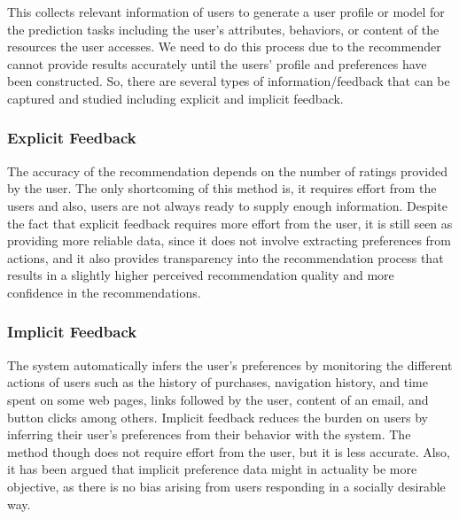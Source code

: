 \documentclass[12pt,oneside,openright,a4paper]{cpe-english-project}
\begin{document}
This collects relevant information of users to generate a user profile or model for the prediction tasks including the user’s attributes, behaviors, or content of the resources the user accesses. \cite{WhatisMachineLearning} We need to do this process due to the recommender cannot provide results accurately until the users’ profile and preferences have been constructed. So, there are several types of information/feedback that can be captured and studied including explicit and implicit feedback.


\subsubsection{Explicit Feedback}

The accuracy of the recommendation depends on the number of ratings provided by the user. The only shortcoming of this method is, it requires effort from the users and also, users are not always ready to supply enough information. Despite the fact that explicit feedback requires more effort from the user, it is still seen as providing more reliable data, since it does not involve extracting preferences from actions, and it also provides transparency into the recommendation process that results in a slightly higher perceived recommendation quality and more confidence in the recommendations. \cite{Recommendersystem}

\subsubsection{Implicit Feedback}

The system automatically infers the user’s preferences by monitoring the different actions of users such as the history of purchases, navigation history, and time spent on some web pages, links followed by the user, content of an email, and button clicks among others. Implicit feedback reduces the burden on users by inferring their user’s preferences from their behavior with the system. The method though does not require effort from the user, but it is less accurate. Also, it has been argued that implicit preference data might in actuality be more objective, as there is no bias arising from users responding in a socially desirable way. \cite{Recommendersystem}
\end{document}
